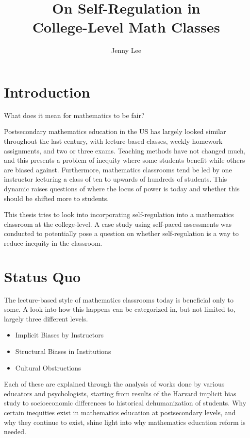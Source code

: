 \documentclass[thesis]{hmcposter}
\author{Jenny Lee}
\title{On Self-Regulation in\\College-Level Math Classes}
\begin{document}
\begin{poster}

\section{Introduction}
What does it mean for mathematics to be fair?

Postsecondary mathematics education in the US has largely looked similar throughout the last century, with lecture-based classes, weekly homework assignments, and two or three exams. Teaching methods have not changed much, and this presents a problem of inequity where some students benefit while others are biased against. Furthermore, mathematics classrooms tend be led by one instructor lecturing a class of ten to upwards of hundreds of students. This dynamic raises questions of where the locus of power is today and whether this should be shifted more to students.

This thesis tries to look into incorporating self-regulation into a mathematics classroom at the college-level. A case study using self-paced assessments was conducted to potentially pose a question on whether self-regulation is a way to reduce inequity in the classroom.


\section{Status Quo}
The lecture-based style of mathematics classrooms today is beneficial only to some. A look into how this happens can be categorized in, but not limited to, largely three different levels.

\begin{itemize}
  \item Implicit Biases by Instructors
  \item Structural Biases in Institutions
  \item Cultural Obstructions
\end{itemize}

Each of these are explained through the analysis of works done by various educators and psychologists, starting from results of the Harvard implicit bias study to socioeconomic differences to historical dehumanization of students. Why certain inequities exist in mathematics education at postsecondary levels, and why they continue to exist, shine light into why mathematics education reform is needed.


\end{poster}
\end{document}
